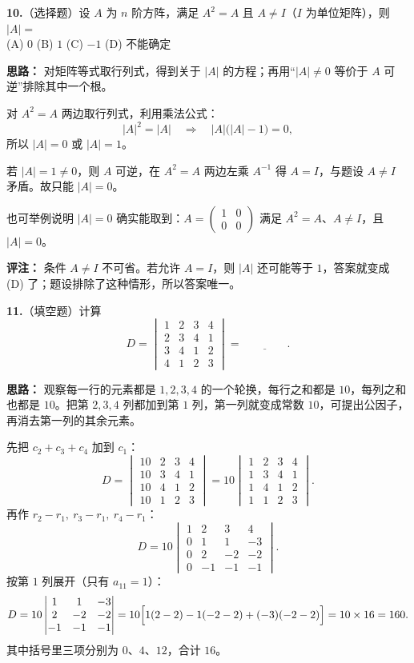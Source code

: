 \textbf{10.}（选择题）设 $A$ 为 $n$ 阶方阵，满足 $A^{2}=A$ 且 $A\neq I$（$I$ 为单位矩阵），则 $|A|=$\\
(A) $0$ \quad (B) $1$ \quad (C) $-1$ \quad (D) 不能确定

\ifshowsolutions%
\textbf{思路：} 对矩阵等式取行列式，得到关于 $|A|$ 的方程；再用“$|A|\neq0$ 等价于 $A$ 可逆”排除其中一个根。

对 $A^{2}=A$ 两边取行列式，利用乘法公式：
\[
|A|^{2}=|A|\quad\Longrightarrow\quad |A|\bigl(|A|-1\bigr)=0,
\]
所以 $|A|=0$ 或 $|A|=1$。

若 $|A|=1\neq0$，则 $A$ 可逆，在 $A^{2}=A$ 两边左乘 $A^{-1}$ 得 $A=I$，与题设 $A\neq I$ 矛盾。故只能 $|A|=0$。

也可举例说明 $|A|=0$ 确实能取到：$A=\begin{pmatrix}1&0\\0&0\end{pmatrix}$ 满足 $A^{2}=A$、$A\neq I$，且 $|A|=0$。

\textbf{评注：} 条件 $A\neq I$ 不可省。若允许 $A=I$，则 $|A|$ 还可能等于 $1$，答案就变成 (D) 了；题设排除了这种情形，所以答案唯一。


\else \answerarea[4] \fi%

\textbf{11.}（填空题）计算
\[
D=\begin{vmatrix}
1&2&3&4\\
2&3&4&1\\
3&4&1&2\\
4&1&2&3
\end{vmatrix}=\underline{\qquad\qquad}.
\]

\ifshowsolutions%
\textbf{思路：} 观察每一行的元素都是 $1,2,3,4$ 的一个轮换，每行之和都是 $10$，每列之和也都是 $10$。把第 $2,3,4$ 列都加到第 $1$ 列，第一列就变成常数 $10$，可提出公因子，再消去第一列的其余元素。

先把 $c_2+c_3+c_4$ 加到 $c_1$：
\[
D=\begin{vmatrix}
10&2&3&4\\
10&3&4&1\\
10&4&1&2\\
10&1&2&3
\end{vmatrix}
=10\begin{vmatrix}
1&2&3&4\\
1&3&4&1\\
1&4&1&2\\
1&1&2&3
\end{vmatrix}.
\]
再作 $r_2-r_1,\ r_3-r_1,\ r_4-r_1$：
\[
D=10\begin{vmatrix}
1&2&3&4\\
0&1&1&-3\\
0&2&-2&-2\\
0&-1&-1&-1
\end{vmatrix}.
\]
按第 $1$ 列展开（只有 $a_{11}=1$）：
\[
D=10\begin{vmatrix}
1&1&-3\\
2&-2&-2\\
-1&-1&-1
\end{vmatrix}
=10\Bigl[1(2-2)-1(-2-2)+(-3)(-2-2)\Bigr]=10\times16=160 .
\]
其中括号里三项分别为 $0$、$4$、$12$，合计 $16$。

